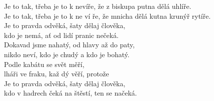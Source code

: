\nv{}Je to tak, třeba je to k nevíře, že z biskupa putna dělá uhlíře.\\
Je \sm {}\sm to \nc {}tak, třeba je to k ne ví \sm{}ře, \sm{} že mnicha dělá kutna krunýř rytíře.
\vnv\\
\nv{}Je to pravda odvěká, šaty dělaj člověka,\\
kdo je nemá, ať od lidí pranic nečeká.\\
Dokavad jsme nahatý, od hlavy až do paty,\\
nikdo neví, kdo je chudý a kdo je bohatý.
\vnv\\
\nv{}Podle kabátu se \sm{}svět měří, \mm{}\\
lháři ve \sm fra\sm{}ku, kaž dý věří, protože\\
Je to pravda odvěká, šaty dělaj člověka,\\
kdo v hadrech čeká na štěstí, \sm {}ten se načeká.

\newpage

